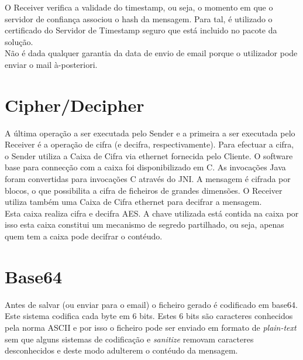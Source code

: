 O Receiver verifica a validade do timestamp, ou seja, o momento em que o servidor de confiança associou o hash da mensagem. Para tal, é utilizado o certificado do Servidor de Timestamp seguro que está incluido no pacote da solução. \\
Não é dada qualquer garantia da data de envio de email porque o utilizador pode enviar o mail à-posteriori. \\

\section{Cipher/Decipher}
A última operação a ser executada pelo Sender e a primeira a ser executada pelo Receiver é a operação de cifra (e decifra, respectivamente).
Para efectuar a cifra, o Sender utiliza a Caixa de Cifra via ethernet fornecida pelo Cliente. O software base para connecção com a caixa foi disponibilizado em C. As invocações Java foram convertidas para invocações C através do JNI.
A mensagem é cifrada por blocos, o que possibilita a cifra de ficheiros de grandes dimensões.
O Receiver utiliza também uma Caixa de Cifra ethernet para decifrar a mensagem.\\
Esta caixa realiza cifra e decifra AES. A chave utilizada está contida na caixa por isso esta caixa constitui um mecanismo de segredo partilhado, ou seja, apenas quem tem a caixa pode decifrar o contéudo.

\section{Base64}
Antes de salvar (ou enviar para o email) o ficheiro gerado é codificado em base64. Este sistema codifica cada byte em 6 bits. Estes 6 bits são caracteres conhecidos pela norma ASCII e por isso o ficheiro pode ser enviado em formato de \textit{plain-text} sem que alguns sistemas de codificação e \textit{sanitize} removam caracteres desconhecidos e deste modo adulterem o contéudo da mensagem.


